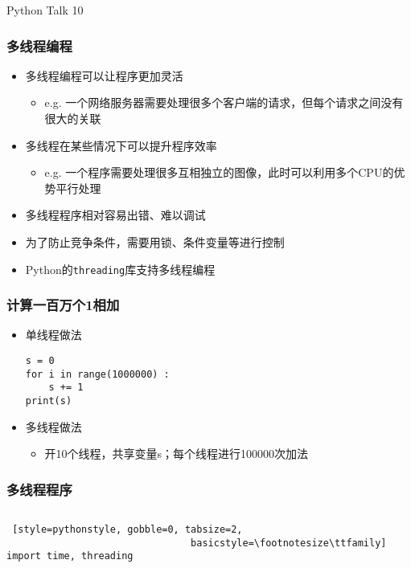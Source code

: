 


\begin{CJK}{UTF8}{gbsn}

\PreFirstFrame
\begin{frame} [fragile]
	\centerline{\fontsize{42}{42}\selectfont Python Talk 10}
\end{frame}
\PostFirstFrame

\begin{frame}
	\frametitle{多线程编程}
	\begin{itemize}
	\item 多线程编程可以让程序更加灵活
		\begin{itemize}
		\item e.g. 一个网络服务器需要处理很多个客户端的请求，但每个请求之间没有很大的关联
		\end{itemize}
	\item 多线程在某些情况下可以提升程序效率
		\begin{itemize}
		\item e.g. 一个程序需要处理很多互相独立的图像，此时可以利用多个CPU的优势平行处理
		\end{itemize}
	\item 多线程程序相对容易出错、难以调试
	\item 为了防止竞争条件，需要用锁、条件变量等进行控制
	\item Python的\texttt{threading}库支持多线程编程
	\end{itemize}
\end{frame}

\begin{frame} [fragile]
	\frametitle{计算一百万个1相加}
	\begin{itemize}
	\item 单线程做法
	\begin{lstlisting}[style=pythonstyle, gobble=0]
s = 0
for i in range(1000000) :
	s += 1
print(s)
	\end{lstlisting}
	\item 多线程做法
		\begin{itemize}
		\item 开10个线程，共享变量s；每个线程进行100000次加法
		\end{itemize}
	\end{itemize}
\end{frame}

\begin{frame} [fragile]
	\frametitle{多线程程序}
	\begin{columns}[T]
		\begin{column}[T]{.5\textwidth}
			\begin{lstlisting} [style=pythonstyle, gobble=0, tabsize=2,
								basicstyle=\footnotesize\ttfamily]
import time, threading


\end{lstlisting}
\end{column}
\end{columns}
\end{frame}
\end{CJK}
